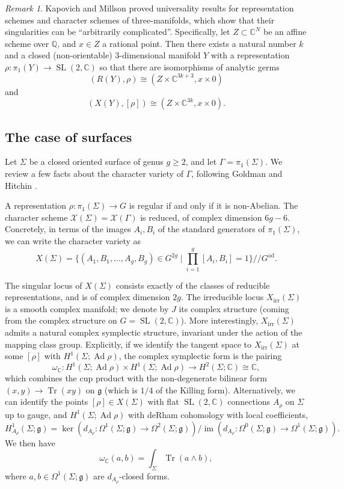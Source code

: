\documentclass [11pt]{amsart}
\theoremstyle{remark}
\newtheorem {remark}[theorem]{Remark}
\def\cc {{\mathbb{C}}}
\def\C{\cc}
\def\sslash {/ \! /}
\def\g{\mathfrak{g}}
\def\Gad{G^{\operatorname{ad}}}
\def\sl {{\operatorname{SL}(2, \cc)}}
\def\Ad {\operatorname{Ad}}
\def\im {\operatorname{im}}
\def\Char {X}
\def\Chars {\mathscr{X} \!}
\def\CharIrr {\Char_{\operatorname{irr}}}
\def\tr {\operatorname{Tr }}
\def\omegac{\omega_{\C}}
\begin{document}
\begin{remark}
Kapovich and Millson \cite{KapovichMillson} proved universality results for representation schemes and character schemes of three-manifolds, which show that their singularities can be ``arbitrarily complicated''. Specifically, let $Z \subset \C^N$ be an affine scheme over ${\mathbb Q}$, and $x \in Z$ a rational point. Then there exists a  natural number $k$ and a closed (non-orientable) $3$-dimensional manifold $Y$ with a representation $\rho: \pi_1(Y) \to \sl$ so that there are isomorphisms of analytic germs 
$$ (R(Y), \rho) \cong (Z \times \C^{3k+3}, x \times 0)$$
and
$$ (X(Y), [\rho]) \cong (Z \times \C^{3k}, x \times 0).$$
\end{remark}


\subsection{The case of surfaces}
\label{sec:surfaces}
Let $\Sigma$ be a closed oriented surface of genus $g \geq 2$, and let $\Gamma = \pi_1(\Sigma)$. We review a few facts about the character variety of $\Gamma$, following Goldman \cite{Goldman, GoldmanSL2C} and Hitchin \cite{Hitchin}.

A representation $\rho: \pi_1(\Sigma) \to G$ is regular if and only if it is non-Abelian. The character scheme $\Chars(\Sigma)= \Chars(\Gamma)$ is reduced, of complex dimension $6g-6$. Concretely, in terms of the images $A_i, B_i$ of the standard generators of $\pi_1(\Sigma)$, we can write the character variety as
\begin{equation}
\label{eq:CS}
 \Char(\Sigma) =\bigl \{ (A_1, B_1, \dots, A_g, B_g) \in G^{2g}  \mid \prod_{i=1}^g [A_i, B_i]=1\}\sslash \Gad.\end{equation}

The singular locus of $\Char(\Sigma)$ consists exactly of the classes of reducible representations, and is of complex dimension $2g$. The irreducible locus $\CharIrr(\Sigma)$ is a smooth complex manifold; we denote by $J$ its complex structure (coming from the complex structure on $G=\sl$). More interestingly, $\CharIrr(\Sigma)$ admits a natural complex symplectic structure, invariant under the action of the mapping class group. Explicitly, if we identify the tangent space to $\CharIrr(\Sigma)$ at some $[\rho]$ with $H^1(\Sigma; \Ad \rho)$, the complex symplectic form is the pairing
\begin{equation}
\label{eq:omegac}
\omegac: H^1(\Sigma; \Ad \rho) \times H^1(\Sigma; \Ad \rho) \to H^2(\Sigma; \C) \cong \C,
\end{equation}
which combines the cup product with the non-degenerate bilinear form $(x, y) \to \tr(xy)$ on $\g$ (which is $1/4$ of the Killing form). Alternatively, we can identify the points $[\rho]\in\Char(\Sigma)$ with flat $\sl$ connections $A_{\rho}$ on $\Sigma$ up to gauge, and $H^1(\Sigma; \Ad \rho)$ with deRham cohomology with local coefficients, 
$$H^1_{A_\rho} (\Sigma; \g) = \ker(d_{A_{\rho}}: \Omega^1(\Sigma; \g) \to \Omega^2(\Sigma; \g))/\im(d_{A_{\rho}}: \Omega^0(\Sigma; \g) \to \Omega^1(\Sigma; \g)).$$ We then have
$$\omegac(a, b) = \int_\Sigma \tr(a \wedge b),$$
where $a, b \in \Omega^1(\Sigma; \g)$ are $d_{A_\rho}$-closed forms.
\end{document}
